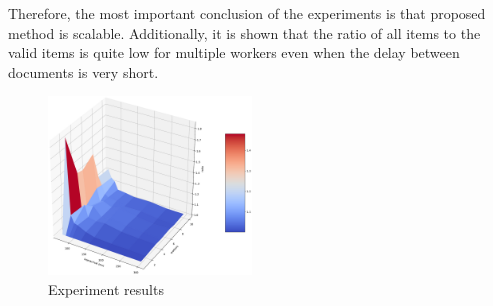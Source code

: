 Therefore, the most important conclusion of the experiments is that proposed method is scalable. Additionally, it is shown that the ratio of all items to the valid items is quite low for multiple workers even when the delay between documents is very short.

\begin{figure}[htbp]
  \centering
  \includegraphics[width=0.48\textwidth]{pics/experiment}
  \caption{Experiment results}
  \label {experiment}
\end{figure}
